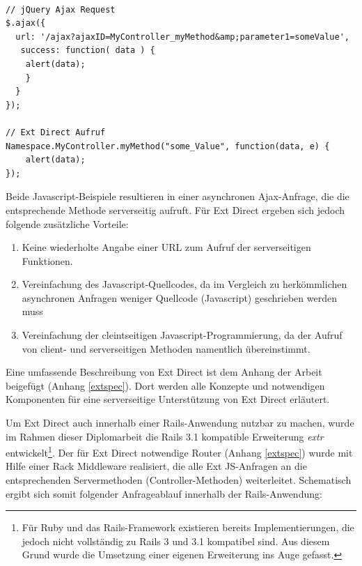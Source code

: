\begin{lstlisting}[label=extinvoke, caption=Ajax-Anfrage an einen Server im jQuery-Framework]

// jQuery Ajax Request
$.ajax({
  url: '/ajax?ajaxID=MyController_myMethod&amp;parameter1=someValue',
   success: function( data ) {
    alert(data);
    }
  }
});

// Ext Direct Aufruf
Namespace.MyController.myMethod("some_Value", function(data, e) {
  	alert(data);
});

\end{lstlisting}

Beide Javascript-Beispiele resultieren in einer asynchronen Ajax-Anfrage, die die entsprechende Methode serverseitig aufruft. Für Ext Direct ergeben sich jedoch folgende zusätzliche Vorteile:

\begin{enumerate}
\item
Keine wiederholte Angabe einer URL zum Aufruf der serverseitigen Funktionen.
\item
Vereinfachung des Javascript-Quellcodes, da im Vergleich zu herkömmlichen asynchronen Anfragen weniger Quellcode (Javascript) geschrieben werden muss
\item
Vereinfachung der cleintseitigen Javascript-Programmierung, da der Aufruf von client- und serverseitigen Methoden namentlich übereinstimmt.
\end{enumerate}

Eine umfassende Beschreibung von Ext Direct ist dem Anhang der Arbeit beigefügt (Anhang \ref{extspec}). Dort werden alle Konzepte und notwendigen Komponenten für eine serverseitige Unterstützung von Ext Direct erläutert.


Um Ext Direct auch innerhalb einer Rails-Anwendung nutzbar zu machen, wurde im Rahmen dieser Diplomarbeit die Rails 3.1 kompatible Erweiterung \emph{extr} entwickelt\footnote{Für Ruby und das Rails-Framework existieren bereits Implementierungen, die jedoch nicht vollständig zu Rails 3 und 3.1 kompatibel sind. Aus diesem Grund wurde die Umsetzung einer eigenen Erweiterung ins Auge gefasst.}.
Der für Ext Direct notwendige Router (Anhang \ref{extspec}) wurde mit Hilfe einer Rack Middleware realisiert, die alle Ext JS-Anfragen an die entsprechenden Servermethoden (Controller-Methoden) weiterleitet. Schematisch ergibt sich somit folgender Anfrageablauf innerhalb der Rails-Anwendung:

